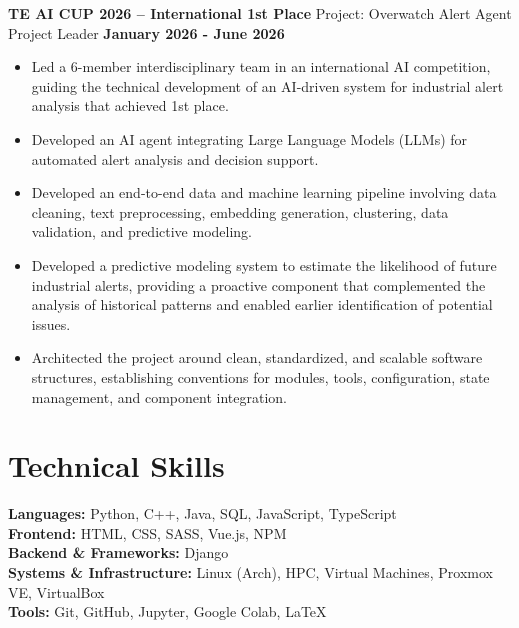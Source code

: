 \documentclass[11pt]{article}
\begin{document}
\textbf{TE AI CUP 2026 -- International 1st Place} \hfill Project: Overwatch Alert Agent\\
Project Leader \hfill \textbf{January 2026 - June 2026}
\vspace{-0.3cm}
\begin{itemize}[leftmargin=*]
    \item Led a 6-member interdisciplinary team in an international AI competition, guiding the technical development of an AI-driven system for industrial alert analysis that achieved 1st place. 

    \vspace{-0.3cm} 
    \item Developed an AI agent integrating Large Language Models (LLMs) for automated alert analysis and decision support.

    \vspace{-0.3cm} 
    \item Developed an end-to-end data and machine learning pipeline involving data cleaning, text preprocessing, embedding generation, clustering, data validation, and predictive modeling. 

    \vspace{-0.3cm}
    \item Developed a predictive modeling system to estimate the likelihood of future industrial alerts, providing a proactive component that complemented the analysis of historical patterns and enabled earlier identification of potential issues.

    \vspace{-0.3cm} 
    \item Architected the project around clean, standardized, and scalable software structures, establishing conventions for modules, tools, configuration, state management, and component integration. 
\end{itemize}





\section*{Technical Skills}
\textbf{Languages:} Python, C++, Java, SQL, JavaScript, TypeScript\\
\textbf{Frontend:} HTML, CSS, SASS, Vue.js, NPM\\
\textbf{Backend \& Frameworks:} Django\\
\textbf{Systems \& Infrastructure:} Linux (Arch), HPC, Virtual Machines, Proxmox VE, VirtualBox\\
\textbf{Tools:} Git, GitHub, Jupyter, Google Colab, LaTeX
\end{document}
